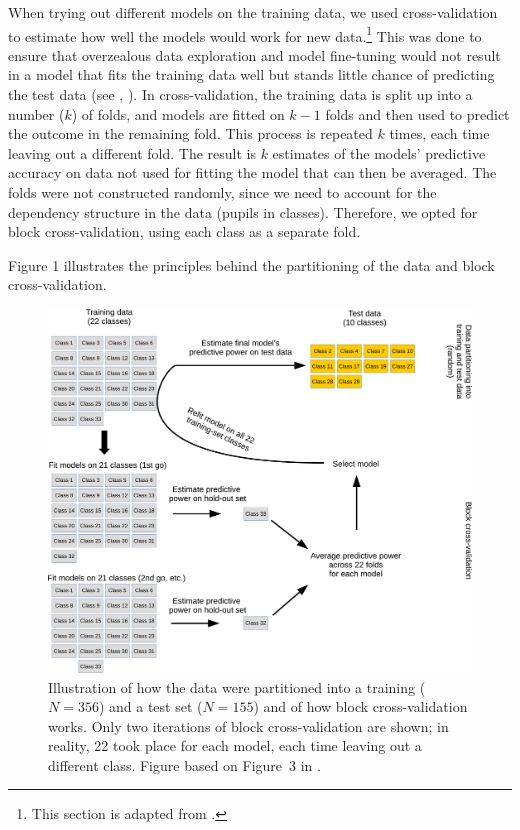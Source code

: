 \documentclass[output=paper]{langsci/langscibook}
\begin{document}
When trying out different models on the training data, we used cross-validation to estimate how well the models would work for new data.\footnote{This section is adapted from \citet{VanhoveEtAl2019}.} This was done to ensure that overzealous data exploration and model fine-tuning would not result in a model that fits the training data well but stands little chance of predicting the test data (see \citealt{KuhnJohnson2013}, \citealt{YarkoniWestfall2017}). In cross-validation, the training data is split up into a number ($k$) of folds, and models are fitted on $k-1$ folds and then used to predict the outcome in the remaining fold. This process is repeated $k$ times, each time leaving out a different fold. The result is $k$ estimates of the models’ predictive accuracy on data not used for fitting the model that can then be averaged. The folds were not constructed randomly, since we need to account for the dependency structure in the data (pupils in classes). Therefore, we opted for block cross-validation, using each class as a separate fold.

Figure 1 illustrates the principles behind the partitioning of the data and block cross-validation.


\begin{figure}
\includegraphics[width=\textwidth]{figures/figure4.1.cross-validation.pdf}
\caption{Illustration of how the data were partitioned into a training ($N=356$) and a test set ($N=155$) and of how block cross-validation works. Only two iterations of block cross-validation are shown; in reality, 22 took place for each model, each time leaving out a different class. Figure based on Figure~3 in \citet{VanhoveEtAl2019}.}
\label{fig:04:1}
\end{figure}
\end{document}
